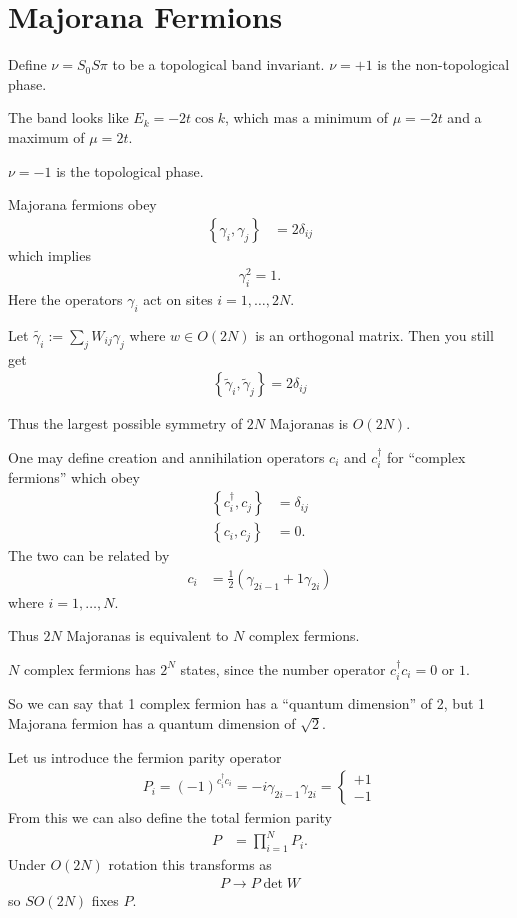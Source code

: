 \section{Majorana Fermions}
Define $\nu=S_0 S\pi$ to be a topological band invariant.
$\nu=+1$ is the non-topological phase.

The band looks like $E_k = -2t\cos k$,
which mas a minimum of $\mu = -2t$ and a maximum of $\mu= 2t$.

$\nu = -1$ is the topological phase.

Majorana fermions obey
\begin{align}
    \left\{ \gamma_i, \gamma_j \right\} &= 2\delta_{ij}
\end{align}
which implies
\begin{align}
    \gamma_{i}^2 = 1.
\end{align}
Here the operators
$\gamma_i$ act on sites $i=1,\ldots,2N$.

Let $\tilde{\gamma_i}:=\sum_{j} W_{ij}\gamma_j$
where $w\in O(2N)$ is an orthogonal matrix.
Then you still get
\begin{align}
    \left\{ \tilde{\gamma}_i, \tilde{\gamma}_j \right\} = 2\delta_{ij}
\end{align}

Thus the largest possible symmetry of $2N$ Majoranas is
$O(2N)$.

One may define creation and annihilation operators
$c_i$ and $c_i^\dagger$ for ``complex fermions''
which obey
\begin{align}
    \left\{ c_i^\dagger, c_j \right\} &= \delta_{ij}\\
    \left\{ c_i, c_j \right\} &= 0.
\end{align}
The two can be related by
\begin{align}
    c_i &= \frac{1}{2}\left(
        \gamma_{2i - 1} + 1\gamma_{2i}
    \right) 
\end{align}
where $i=1,\ldots,N$.

Thus $2N$ Majoranas is equivalent to $N$ complex fermions.

$N$ complex fermions has $2^{N}$ states,
since the number operator $c_i^\dagger c_i = 0$ or $1$.

So we can say that 1 complex fermion has a
``quantum dimension'' of 2,
but 1 Majorana fermion has a quantum dimension of $\sqrt{2}$.

Let us introduce the fermion parity operator
\begin{align}
    P_i = {\left( -1 \right)}^{c_i^\dagger c_i}
    = -i \gamma_{2i - 1}\gamma_{2i}=
    \begin{cases}
        +1\\
        -1
    \end{cases}
\end{align}
From this we can also define the total fermion parity
\begin{align}
    P &= \prod_{i=1}^{N} P_i.
\end{align}
Under $O(2N)$ rotation this transforms as
\begin{align}
    P \to P\det W
\end{align}
so $SO(2N)$ fixes $P$.

